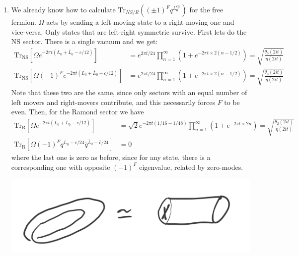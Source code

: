 \documentclass[11pt]{article}
\begin{document}
\begin{enumerate}
	\item We already know how to calculate $\mathrm{Tr}_{NS/R} ( (\pm1)^F q^{L_0^{cyl}})$ for the free fermion. $\Omega$ acts by sending a left-moving state to a right-moving one and vice-versa. Only states that are left-right symmetric survive. First lets do the NS sector. There is a single vacuum and we get:
	\[
	\begin{aligned}
		\mathrm{Tr_{NS}} [ \Omega e^{-2\pi t(L_0 + \bar L_0 - c/12)}] &= e^{ 2 \pi t/24} \prod_{n=1}^\infty (1 + e^{- 2 \pi t \times 2 (n - 1/2)}) =  \sqrt{\frac{\theta_3 (2 i t)}{\eta(2 i t)}}\\
		\mathrm{Tr_{NS}} [ \Omega (-1)^F e^{-2\pi t(L_0 + \bar L_0 - c/12)}] &= e^{ 2 \pi t/24} \prod_{n=1}^\infty (1 + e^{- 2 \pi t \times 2 (n - 1/2)}) = \sqrt{\frac{\theta_3 (2 i t)}{\eta(2 i t)}}
	\end{aligned}
	\]
	Note that these two are the same, since only sectors with an equal number of left movers and right-movers contribute, and this necessarily forces $F$ to be even. Then, for the Ramond sector we have
	\[
	\begin{aligned}
		\mathrm{Tr_{R}} [ \Omega e^{-2\pi t(L_0 + \bar L_0 - c/12)}] &= \sqrt 2 e^{-2 \pi t (1/16-1/48)} \prod_{n=1}^\infty (1 + e^{- 2 \pi t \times 2 n}) = \sqrt{\frac{\theta_2(2 i t)}{\eta(2 i t)}}\\
		\mathrm{Tr_{R}} [ \Omega (-1)^F q^{L_0 - c/24} \bar q^{\bar L_0 - \bar c/24}] &= 0
	\end{aligned}
	\]
	where the last one is zero as before, since for any state, there is a corresponding one with opposite $(-1)^F$ eigenvalue, related by zero-modes. 

	
    \begin{center}
    	\includegraphics[scale=0.1]{"Drawings/Mobius"}
    \end{center}

\end{enumerate}

\end{document}
